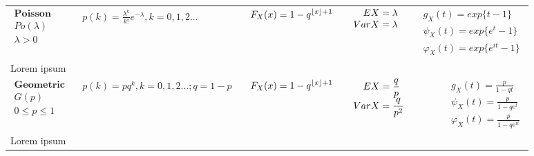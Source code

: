 \documentclass{article}
\DeclarePairedDelimiter\floor{\lfloor}{\rfloor}
\begin{document}
\begin{landscape}
\begin{table}[ht]
\begin{tabular}{@{}l p{6.5cm} p{4.5cm} p{3.0cm} r@{}}
    
$\begin{array}{l}
    \textbf{Poisson} \\
    Po(\lambda) \\
    \lambda > 0
\end{array}$ & 
$\begin{array}{l}
\displaystyle p(k) = \frac{\lambda^k}{k!} e^{-\lambda}, k = 0,1,2...\\
\end{array}$ & 
$\begin{array}{l}
\displaystyle F_X(x) = 1 - q^{\floor{x} + 1}
\end{array}$ & 
$\begin{array}{l}
\displaystyle \hspace{0.36cm}  EX = \lambda \\
\displaystyle VarX = \lambda
\end{array}$ & 
$\begin{array}{r}
\displaystyle g_X(t) = exp\{t-1\} \\
\displaystyle \psi_X(t) =  exp\{ e^t-1\} \\
\displaystyle \varphi_X(t) = exp\{ e^{it}-1\}
\end{array}$ \\
\multicolumn{4}{p{19cm}}{Lorem ipsum} \\



        $\begin{array}{l}
                \textbf{Geometric} \\
                G(p) \\
                0 \leq p \leq 1
        \end{array}$ & 
        $\begin{array}{l}
        \displaystyle p(k) = p q^{k}, k = 0,1,2... ; q = 1-p\\
        \end{array}$ & 
        $\begin{array}{l}
            \displaystyle F_X(x) = 1 - q^{\floor{x} + 1}
        \end{array}$ & 
        $\begin{array}{l}
        \displaystyle \hspace{0.36cm}  EX = \frac{q}{p} \\
        \displaystyle VarX = \frac{q}{p^2}
        \end{array}$ & 
        $\begin{array}{r}
        \displaystyle g_X(t) = \frac{p}{1-qt} \\
        \displaystyle \psi_X(t) = \frac{p}{1-qe^{t}} \\
        \displaystyle \varphi_X(t) = \frac{p}{1-qe^{it}}
        \end{array}$ \\
        \multicolumn{4}{p{19cm}}{Lorem ipsum} \\
        

\end{tabular}
\end{table}
\end{landscape}
\end{document}
